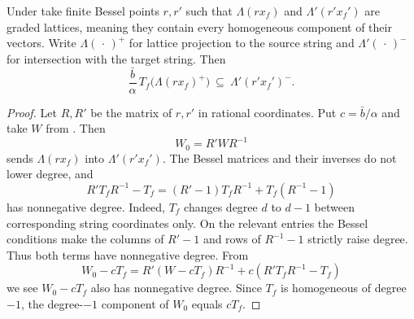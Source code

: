 \begin{lemma}
\label{lem:a-frequency-graded-lattices}
\emitthmsource
Under  take finite Bessel points $r,r'$ such that $\Lambda(rx_f)$ and $\Lambda'(r'x_f')$ are graded lattices, meaning they contain every homogeneous component of their vectors. Write $\Lambda(\,\cdot\,)^+$ for lattice projection to the source string and $\Lambda'(\,\cdot\,)^-$ for intersection with the target string. Then
\[
  \frac{\bar b}{\alpha}\,
     T_f\bigl(\Lambda(rx_f)^+\bigr)
  \ \subseteq\ \Lambda'(r'x_f')^- .
\]
\end{lemma}
\begin{proof}
Let $R,R'$ be the matrix of $r,r'$ in rational coordinates. Put $c=\bar b/\alpha$ and take $W$ from . Then
\[
 W_0=R'W R^{-1}
\]
sends $\Lambda(rx_f)$ into $\Lambda'(r'x_f')$. The Bessel matrices and their inverses do not lower degree, and
\[
 R'T_f R^{-1}-T_f
   =(R'-1)T_f R^{-1}+T_f(R^{-1}-1)
\]
has nonnegative degree. Indeed, $T_f$ changes degree $d$ to $d-1$ between corresponding string coordinates only. On the relevant entries the Bessel conditions make the columns of $R'-1$ and rows of $R^{-1}-1$ strictly raise degree. Thus both terms have nonnegative degree. From
\[
 W_0-cT_f=R'(W-cT_f)R^{-1}+c(R'T_fR^{-1}-T_f)
\]
we see $W_0-cT_f$ also has nonnegative degree. Since $T_f$ is homogeneous of degree $-1$, the degree-$-1$ component of $W_0$ equals $cT_f$.


\end{proof}
